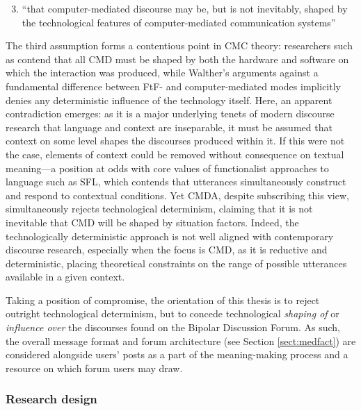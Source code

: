 			\begin{enumerate}
			\setcounter{enumi}{2}
			\item ``that computer-mediated discourse may be, but is not inevitably, shaped by the technological features of computer-mediated communication systems''
			\end{enumerate}

			The third assumption forms a contentious point in CMC theory: researchers such as \textcite{boyd_social_2007} contend that all CMD must be shaped by both the hardware and software on which the interaction was produced, while Walther's \citeyear{walther_computer-mediated_1996} arguments against a fundamental difference between FtF- and computer-mediated modes implicitly denies any deterministic influence of the technology itself. Here, an apparent contradiction emerges: as it is a major underlying tenets of modern discourse research that language and context are inseparable, it must be assumed that context on some level shapes the discourses produced within it. If this were not the case, elements of context could be removed without consequence on textual meaning---a position at odds with core values of functionalist approaches to language such as SFL, which contends that utterances simultaneously construct and respond to contextual conditions. Yet CMDA, despite subscribing this view, simultaneously rejects technological determinism, claiming that it is not inevitable that CMD will be shaped by situation factors. Indeed, the technologically deterministic approach is not well aligned with contemporary discourse research, especially when the focus is CMD, as it is reductive and deterministic, placing theoretical constraints on the range of possible utterances available in a given context.

			Taking a position of compromise, the orientation of this thesis is to reject outright technological determinism, but to concede technological \emph{shaping of} or \emph{influence over} the discourses found on the Bipolar Discussion Forum. As such, the overall message format and forum architecture (see Section \ref{sect:medfact}) are considered alongside users' posts as a part of the meaning-making process and a resource on which forum users may draw.

		\subsubsection{Research design}

			  ~\\

